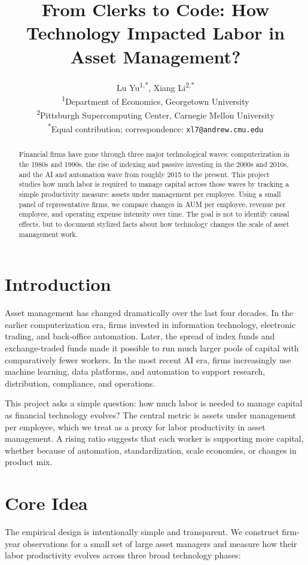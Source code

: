 \documentclass{article}
\title{From Clerks to Code: How Technology Impacted Labor in Asset Management?}
\author{
  \begin{minipage}{0.92\linewidth}
  \centering
  \normalsize
  Lu Yu\textsuperscript{1,*}, Xiang Li\textsuperscript{2,*} \\
  \textsuperscript{1}Department of Economics, Georgetown University \\
  \textsuperscript{2}Pittsburgh Supercomputing Center, Carnegie Mellon University \\
  \textsuperscript{*}Equal contribution; correspondence: \texttt{xl7@andrew.cmu.edu}
  \end{minipage}
}
\begin{document}
\maketitle

\begin{abstract}
Financial firms have gone through three major technological waves: computerization in the 1980s and 1990s, the rise of indexing and passive investing in the 2000s and 2010s, and the AI and automation wave from roughly 2015 to the present. This project studies how much labor is required to manage capital across those waves by tracking a simple productivity measure: assets under management per employee. Using a small panel of representative firms, we compare changes in AUM per employee, revenue per employee, and operating expense intensity over time. The goal is not to identify causal effects, but to document stylized facts about how technology changes the scale of asset management work.
\end{abstract}

\section{Introduction}
Asset management has changed dramatically over the last four decades. In the earlier computerization era, firms invested in information technology, electronic trading, and back-office automation. Later, the spread of index funds and exchange-traded funds made it possible to run much larger pools of capital with comparatively fewer workers. In the most recent AI era, firms increasingly use machine learning, data platforms, and automation to support research, distribution, compliance, and operations.

This project asks a simple question: how much labor is needed to manage capital as financial technology evolves? The central metric is assets under management per employee, which we treat as a proxy for labor productivity in asset management. A rising ratio suggests that each worker is supporting more capital, whether because of automation, standardization, scale economies, or changes in product mix.

\section{Core Idea}
The empirical design is intentionally simple and transparent. We construct firm-year observations for a small set of large asset managers and measure how their labor productivity evolves across three broad technology phases:
\end{document}

